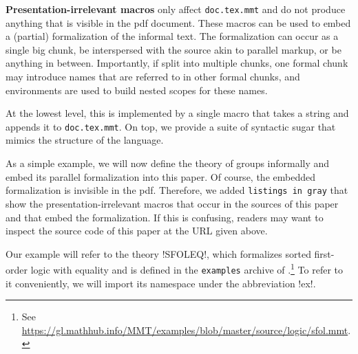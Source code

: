 \textbf{Presentation-irrelevant macros} only affect \texttt{doc.tex.mmt} and do not produce anything that is visible in the pdf document.
These macros can be used to embed a (partial) formalization of the informal text.
The formalization can occur as a single big chunk, be interspersed with the \latex source akin to parallel markup, or be anything in between.
Importantly, if split into multiple chunks, one formal chunk may introduce names that are referred to in other formal chunks, and \latex environments are used to build nested scopes for these names.

At the lowest level, this is implemented by a single macro that takes a string and appends it to \texttt{doc.tex.mmt}.
On top, we provide a suite of syntactic sugar that mimics the structure of the \mmt language.

As a simple example, we will now define the theory of groups informally and embed its parallel \mmt formalization into this paper.
Of course, the embedded formalization is invisible in the pdf.
Therefore, we added \lstinline|listings in gray| that show the presentation-irrelevant macros that occur in the \latex sources of this paper and that embed the formalization.
If this is confusing, readers may want to inspect the source code of this paper at the URL given above.

Our example will refer to the theory !SFOLEQ!, which formalizes sorted first-order logic with equality and is defined in the \texttt{examples} archive of \mmt.\footnote{See \url{https://gl.mathhub.info/MMT/examples/blob/master/source/logic/sfol.mmt}.}
To refer to it conveniently, we will import its namespace under the abbreviation !ex!.

